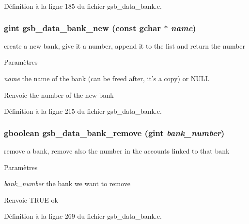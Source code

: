 Définition à la ligne 185 du fichier gsb\_\-data\_\-bank.c.

\subsubsection[{gsb\_\-data\_\-bank\_\-new}]{\setlength{\rightskip}{0pt plus 5cm}gint gsb\_\-data\_\-bank\_\-new (const gchar $\ast$ {\em name})}\label{gsb__data__bank_8h_a7721517163d313bbec38787a9c69386f}
create a new bank, give it a number, append it to the list and return the number


\begin{DoxyParams}{Paramètres}
\item[{\em name}]the name of the bank (can be freed after, it's a copy) or NULL\end{DoxyParams}
\begin{DoxyReturn}{Renvoie}
the number of the new bank 
\end{DoxyReturn}


Définition à la ligne 215 du fichier gsb\_\-data\_\-bank.c.

\subsubsection[{gsb\_\-data\_\-bank\_\-remove}]{\setlength{\rightskip}{0pt plus 5cm}gboolean gsb\_\-data\_\-bank\_\-remove (gint {\em bank\_\-number})}\label{gsb__data__bank_8h_aa64e705d04dde43b81ed590515087267}
remove a bank, remove also the number in the accounts linked to that bank


\begin{DoxyParams}{Paramètres}
\item[{\em bank\_\-number}]the bank we want to remove\end{DoxyParams}
\begin{DoxyReturn}{Renvoie}
TRUE ok 
\end{DoxyReturn}


Définition à la ligne 269 du fichier gsb\_\-data\_\-bank.c.

